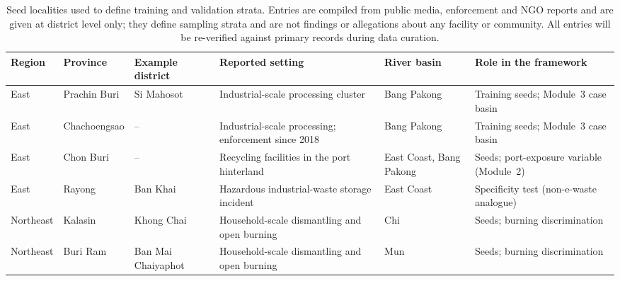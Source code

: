 \documentclass[10pt]{article}
\begin{document}
\begin{table}[t]
\centering
\caption{Seed localities used to define training and validation strata. Entries are compiled from public media, enforcement and NGO reports and are given at district level only; they define sampling strata and are not findings or allegations about any facility or community. All entries will be re-verified against primary records during data curation.}
\label{tab:seeds}
\footnotesize
\begin{tabularx}{\textwidth}{@{}L{1.35cm}L{1.75cm}L{2.15cm}YL{1.75cm}Y@{}}
\toprule
Region & Province & Example district & Reported setting & River basin & Role in the framework\\
\midrule
East & Prachin Buri & Si Mahosot & Industrial-scale processing cluster & Bang Pakong & Training seeds; Module~3 case basin\\
East & Chachoengsao & -- & Industrial-scale processing; enforcement since 2018 & Bang Pakong & Training seeds; Module~3 case basin\\
East & Chon Buri & -- & Recycling facilities in the port hinterland & East Coast, Bang Pakong & Seeds; port-exposure variable (Module~2)\\
East & Rayong & Ban Khai & Hazardous industrial-waste storage incident & East Coast & Specificity test (non-e-waste analogue)\\
Northeast & Kalasin & Khong Chai & Household-scale dismantling and open burning & Chi & Seeds; burning discrimination\\
Northeast & Buri Ram & Ban Mai Chaiyaphot & Household-scale dismantling and open burning & Mun & Seeds; burning discrimination\\
\bottomrule
\end{tabularx}
\end{table}
\end{document}
